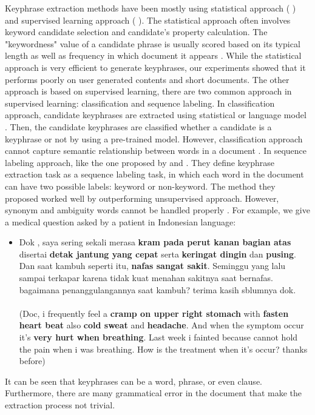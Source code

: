 Keyphrase extraction methods have been mostly using statistical approach (\cite{sparck1972statistical} \cite{zhang2007comparative} \cite{rake} \cite{mihalcea2004textrank}) and supervised learning approach (\cite{witten1999kea} \cite{medelyan2009human} \cite{marujoMAUI}). The statistical approach often involves keyword candidate selection and candidate's property calculation. The "keywordness" value of a candidate phrase is usually scored based on its typical length as well as frequency in which document it appears \cite{rake}. While the statistical approach is very efficient to generate keyphrases, our experiments showed that it performs poorly on user generated contents and short documents. The other approach is based on supervised learning, there are two common approach in supervised learning: classification and sequence labeling. In classification approach, candidate keyphrases are extracted using statistical \cite{sparck1972statistical} or language model \cite{ekpNeuralNetworks}. Then, the candidate keyphrases are classified whether a candidate is a keyphrase or not by using a pre-trained model. However, classification approach cannot capture semantic relationship between words in a document \cite{surveyPopulerTerbaruEkp}.  In sequence labeling approach,  like the one proposed by \cite{cao2010automatically} and \cite{zhang2008automatic}. They define keyphrase extraction task as a sequence labeling task, in which each word in the document can have two possible labels: keyword or non-keyword. The method they proposed worked well by outperforming unsupervised approach. However, synonym and ambiguity words cannot be handled properly \cite{zhang2008automatic}. For example, we give a medical question asked by a patient in Indonesian language:
\begin{itemize}
    \item 
		Dok , saya sering sekali merasa \textbf{kram pada perut kanan bagian atas} disertai \textbf{detak jantung yang cepat} serta \textbf{keringat dingin} dan \textbf{pusing}. Dan saat kambuh seperti itu, \textbf{nafas sangat sakit}. Seminggu yang lalu sampai terkapar karena tidak kuat menahan sakitnya saat bernafas. bagaimana penanggulangannya saat kambuh? terima kasih sblumnya dok. \\\\
		(Doc, i frequently feel a \textbf{cramp on upper right stomach} with \textbf{fasten heart beat} also \textbf{cold sweat} and \textbf{headache}. And when the symptom occur it's \textbf{very hurt when breathing}. Last week i fainted because cannot hold the pain when i was breathing. How is the treatment when it's occur? thanks before) \\
\end{itemize}
It can be seen that keyphrases can be a word, phrase, or even clause. Furthermore, there are many grammatical error in the document that make the extraction process not trivial.

